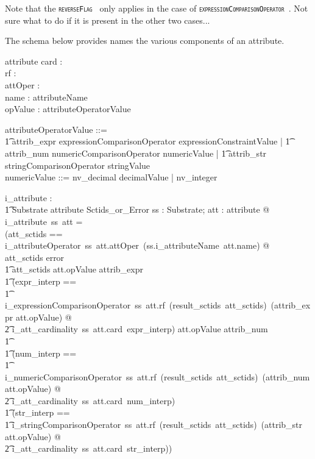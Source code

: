 \documentclass{article}
\def\spec#1{{\tt \small \textsc{{#1}} }}
\begin{document}
Note that the \spec{reverseFlag} only applies in the case of \spec{expressionComparisonOperator}.  Not sure what to do if it is present in the other two cases...

The schema below provides names the various components of an attribute.
\begin{schema}{attribute}
   card : \optional[cardinality] \\
   rf : \optional[reverseFlag] \\
   attOper : \optional[constraintOperator] \\
   name : attributeName \\
   opValue : attributeOperatorValue
\end{schema}

\begin{zed}
attributeOperatorValue ::= \\
\t1 attrib\_expr \ldata expressionComparisonOperator \cross expressionConstraintValue \rdata |
\also
\t1 attrib\_num \ldata numericComparisonOperator \cross numericValue \rdata | 
\also
\t1 attrib\_str \ldata stringComparisonOperator \cross stringValue \rdata \\
\also
numericValue ::= nv\_decimal \ldata decimalValue \rdata |  nv\_integer \ldata \nat \rdata 
\also
[reverseFlag] 
\end{zed}

\begin{axdef}
   i\_attribute : \\
\t1 Substrate  \fun attribute \fun Sctids\_or\_Error
\where
   \forall ss : Substrate; att : attribute @ \\
   i\_attribute~ss~att = \\
   (\LET att\_sctids == i\_attributeOperator~ss~att.attOper~(ss.i\_attributeName~att.name) @ \\
   \IF att\_sctids \in \ran error \THEN \\
   \t1 att\_sctids
\also
   \ELSE \IF att.opValue \in \ran attrib\_expr \THEN \\
\t1 (\LET expr\_interp == \\
\t1 i\_expressionComparisonOperator~ss~att.rf~(result\_sctids~att\_sctids)~(attrib\_expr \inv att.opValue)  @ \\
\t2 i\_att\_cardinality~ss~att.card~expr\_interp)
\also
   \ELSE \IF att.opValue \in \ran attrib\_num \\
\t1 \THEN \\
\t1 (\LET num\_interp == \\
\t1 i\_numericComparisonOperator~ss~att.rf~(result\_sctids~att\_sctids)~(attrib\_num \inv att.opValue)  @ \\
\t2 i\_att\_cardinality~ss~att.card~num\_interp)
\also
   \ELSE  \\
\t1 (\LET str\_interp == \\
\t1 i\_stringComparisonOperator~ss~att.rf~(result\_sctids~att\_sctids)~(attrib\_str \inv att.opValue)  @ \\
\t2 i\_att\_cardinality~ss~att.card~str\_interp))
\end{axdef}
\end{document}
